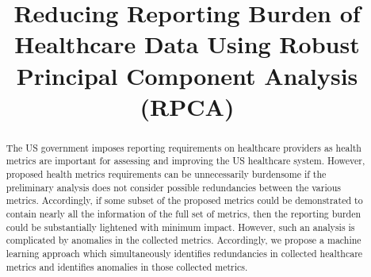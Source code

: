 \documentclass[conference]{IEEEtran}
\begin{document}
\title{Reducing Reporting Burden of Healthcare Data Using Robust Principal Component Analysis (RPCA)}

\author{
\and
{}
\and
{}
}

\maketitle

\thispagestyle{plain}
\pagestyle{plain}

\begin{abstract}
The US government imposes reporting requirements on healthcare providers as health metrics are important for assessing and improving the US healthcare system.  However, proposed health metrics requirements can be unnecessarily burdensome if the preliminary analysis does not consider possible redundancies between the various metrics.  Accordingly, if some subset of the proposed metrics could be demonstrated to contain nearly all the information of  the full set of metrics,
then the reporting burden could be substantially  lightened with minimum impact.  However, such an analysis is complicated by anomalies in the collected metrics.  Accordingly, we propose a machine learning approach which simultaneously identifies redundancies in collected healthcare metrics and identifies anomalies in those collected metrics.
\end{abstract}
\end{document}
